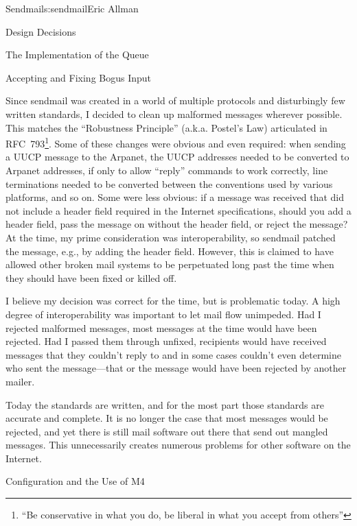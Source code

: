 \begin{aosachapter}{Sendmail}{s:sendmail}{Eric Allman}
\begin{aosasect1}{Design Decisions}
\begin{aosasect2}{The Implementation of the Queue}
\end{aosasect2}

\begin{aosasect2}{Accepting and Fixing Bogus Input}

Since sendmail was created in a world of multiple protocols and
disturbingly few written standards, I decided to clean up malformed
messages wherever possible.
This matches the ``Robustness Principle'' (a.k.a. Postel's Law)
articulated in RFC~793\footnote{``Be conservative in what you do,
be liberal in what you accept from others''}.
Some of these changes were obvious and even required:
when sending a
UUCP message to the Arpanet, the UUCP addresses needed to be converted
to Arpanet addresses, if only to allow ``reply'' commands to work
correctly,
line terminations needed to be converted between the conventions used
by various platforms, and so on.
Some were less obvious: if a message was received that did
not include a  header field required in the Internet
specifications, should you add a  header field, pass the
message on without the  header field, or reject the message?  At
the time, my prime consideration was interoperability, so sendmail
patched the message, e.g., by adding the  header
field. However, this is claimed to have allowed other broken mail
systems to be perpetuated long past the time when they should have
been fixed or killed off.

I believe my decision was correct for the time, but is problematic
today. A high degree of interoperability was important to let mail
flow unimpeded. Had I rejected malformed messages, most messages at
the time would have been rejected. Had I passed them through unfixed,
recipients would have received messages that they couldn't reply to
and in some cases couldn't even determine who sent the message---that
or the message would have been rejected by another mailer.

Today the standards are written, and for the most part those standards
are accurate and complete. It is no longer the case that most messages
would be rejected, and yet there is still mail software out there that
send out mangled messages. This unnecessarily creates numerous
problems for other software on the Internet.

\end{aosasect2}

\begin{aosasect2}{Configuration and the Use of M4}


\end{aosasect2}
\end{aosasect1}
\end{aosachapter}

